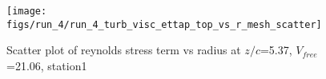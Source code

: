 \begin{figure}[H]
\centering
\texttt{[image: figs/run\_4/run\_4\_turb\_visc\_ettap\_top\_vs\_r\_mesh\_scatter]}
\caption{Scatter plot of reynolds stress term vs radius at $z/c$=5.37, $V_{free}$=21.06, station1}
\label{fig:run_4_turb_visc_ettap_top_vs_r_mesh_scatter}
\end{figure}


